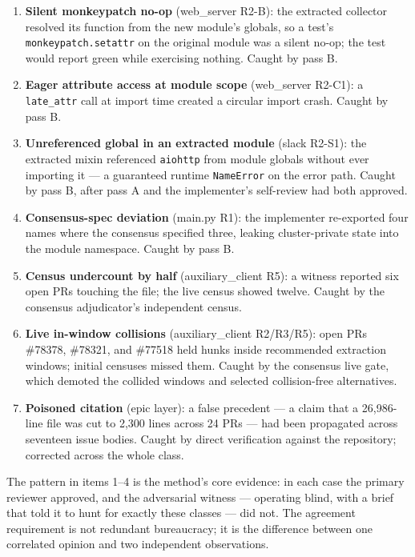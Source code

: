 \documentclass[11pt]{article}
\theoremstyle{definition}
\theoremstyle{plain}
\theoremstyle{remark}
\begin{document}
\begin{enumerate}[leftmargin=*]
\item \textbf{Silent monkeypatch no-op} (web\_server R2-B): the extracted
  collector resolved its function from the new module's globals, so a test's
  \texttt{monkeypatch.setattr} on the original module was a silent no-op; the
  test would report green while exercising nothing. Caught by pass B.
\item \textbf{Eager attribute access at module scope} (web\_server R2-C1): a
  \texttt{late\_attr} call at import time created a circular import crash.
  Caught by pass B.
\item \textbf{Unreferenced global in an extracted module} (slack R2-S1): the
  extracted mixin referenced \texttt{aiohttp} from module globals without
  ever importing it --- a guaranteed runtime \texttt{NameError} on the error
  path. Caught by pass B, after pass A and the implementer's self-review had
  both approved.
\item \textbf{Consensus-spec deviation} (main.py R1): the implementer
  re-exported four names where the consensus specified three, leaking
  cluster-private state into the module namespace. Caught by pass B.
\item \textbf{Census undercount by half} (auxiliary\_client R5): a witness
  reported six open PRs touching the file; the live census showed twelve.
  Caught by the consensus adjudicator's independent census.
\item \textbf{Live in-window collisions} (auxiliary\_client R2/R3/R5): open
  PRs \#78378, \#78321, and \#77518 held hunks inside recommended extraction
  windows; initial censuses missed them. Caught by the consensus live gate,
  which demoted the collided windows and selected collision-free
  alternatives.
\item \textbf{Poisoned citation} (epic layer): a false precedent --- a claim
  that a 26{,}986-line file was cut to 2{,}300 lines across 24 PRs --- had
  been propagated across seventeen issue bodies. Caught by direct
  verification against the repository; corrected across the whole class.
\end{enumerate}

The pattern in items 1--4 is the method's core evidence: in each case the
primary reviewer approved, and the adversarial witness --- operating blind,
with a brief that told it to hunt for exactly these classes --- did not. The
agreement requirement is not redundant bureaucracy; it is the difference
between one correlated opinion and two independent observations.
\end{document}
